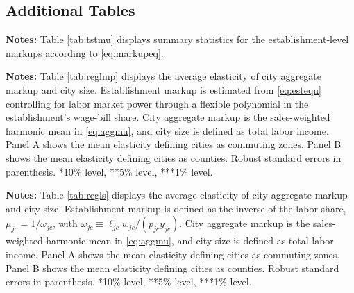 \newpage
\subsection{Additional Tables}\label{a:extrat}

\begin{table}[H]
	\centering
	\begin{threeparttable}
		\caption{Summary Statistics: Markups}
		\label{tab:tstmu}%
		\begin{tablenotes}
		\item \footnotesize{\textbf{Notes:} Table \ref{tab:tstmu} displays summary statistics for the establishment-level markups according to \eqref{eq:markupeq}.}
		\end{tablenotes}
	\end{threeparttable}
\end{table}%

\begin{table}[H]
	\centering
	\begin{threeparttable}
		\caption{Markups Controlling for Labor Market Power}
		\label{tab:reglmp}%
		\begin{tablenotes}
		\item \footnotesize{\textbf{Notes:} Table \ref{tab:reglmp} displays the average elasticity of city aggregate markup and city size. Establishment markup is estimated from \eqref{eq:estequ} controlling for labor market power through a flexible polynomial in the establishment's wage-bill share. City aggregate markup is the sales-weighted harmonic mean in \eqref{eq:aggmu}, and city size is defined as total labor income. Panel A shows the mean elasticity defining cities as commuting zones. Panel B shows the mean elasticity defining cities as counties. Robust standard errors in parenthesis. *10\% level, **5\% level, ***1\% level.}
		\end{tablenotes}
		\end{threeparttable}
\end{table}%

\begin{table}[H]
	\centering
	\begin{threeparttable}
		\caption{Markups as Inverse Labor Share}
		\label{tab:regls}%
		\begin{tablenotes}
		\item \footnotesize{\textbf{Notes:} Table \ref{tab:regls} displays the average elasticity of city aggregate markup and city size. Establishment markup is defined as the inverse of the labor share, $\mu_{jc} = 1 / \omega_{jc}$, with $\omega_{jc} \equiv \ell_{jc} w_{jc} / (p_{jc} y_{jc})$. City aggregate markup is the sales-weighted harmonic mean in \eqref{eq:aggmu}, and city size is defined as total labor income. Panel A shows the mean elasticity defining cities as commuting zones. Panel B shows the mean elasticity defining cities as counties. Robust standard errors in parenthesis. *10\% level, **5\% level, ***1\% level.}
\end{tablenotes}
\end{threeparttable}
\end{table}%

